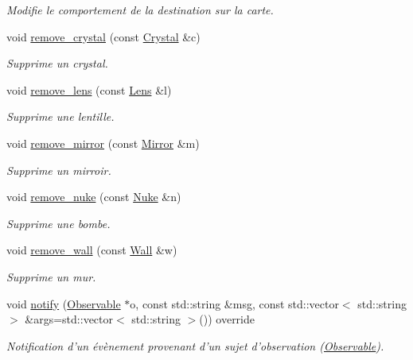 \begin{DoxyCompactItemize}
\begin{DoxyCompactList}\small\item\em Modifie le comportement de la destination sur la carte. \end{DoxyCompactList}\item 
void \hyperlink{classLevel_a764f18515935d4b707fd00c8889147fc}{remove\+\_\+crystal} (const \hyperlink{classCrystal}{Crystal} \&c)
\begin{DoxyCompactList}\small\item\em Supprime un crystal. \end{DoxyCompactList}\item 
void \hyperlink{classLevel_acbde0a8bba52e8f7410fc8def32d29e5}{remove\+\_\+lens} (const \hyperlink{classLens}{Lens} \&l)
\begin{DoxyCompactList}\small\item\em Supprime une lentille. \end{DoxyCompactList}\item 
void \hyperlink{classLevel_a32f71b8f1a06fc1be2fec511c47e5aec}{remove\+\_\+mirror} (const \hyperlink{classMirror}{Mirror} \&m)
\begin{DoxyCompactList}\small\item\em Supprime un mirroir. \end{DoxyCompactList}\item 
void \hyperlink{classLevel_ab88f940133cdc4c052ef48b36269e069}{remove\+\_\+nuke} (const \hyperlink{classNuke}{Nuke} \&n)
\begin{DoxyCompactList}\small\item\em Supprime une bombe. \end{DoxyCompactList}\item 
void \hyperlink{classLevel_a0ee86d08a44f0dfca782e7203f830fd1}{remove\+\_\+wall} (const \hyperlink{classWall}{Wall} \&w)
\begin{DoxyCompactList}\small\item\em Supprime un mur. \end{DoxyCompactList}\item 
void \hyperlink{classLevel_a02cd551cc86ee390aa3559f9f2479a26}{notify} (\hyperlink{classObservable}{Observable} $\ast$o, const std\+::string \&msg, const std\+::vector$<$ std\+::string $>$ \&args=std\+::vector$<$ std\+::string $>$()) override
\begin{DoxyCompactList}\small\item\em Notification d'un évènement provenant d'un sujet d'observation (\hyperlink{classObservable}{Observable}). \end{DoxyCompactList}\end{DoxyCompactItemize}
